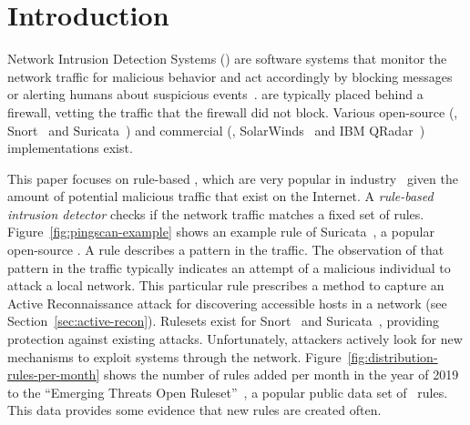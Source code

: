\documentclass[sigconf,review, anonymous]{acmart}
\begin{document}




\maketitle

\section{Introduction}
\label{sec:intro}

Network Intrusion Detection Systems (\nids{}) are software systems
that monitor the network traffic for malicious behavior and act
accordingly by blocking messages or alerting humans about suspicious
events~\cite{Mitchell:2014:SID:2597757.2542049}. \nids{} are typically
placed behind a firewall, vetting the traffic that the firewall did
not block. Various open-source (\eg{}, Snort~\cite{snort} and
Suricata~\cite{suricata}) and commercial (\eg{},
SolarWinds~\cite{solarwinds} and IBM QRadar~\cite{qradar})
implementations exist.

This paper focuses on rule-based \nids{}, which are very popular in
industry~\cite{proofpoint-etpro,snort-rule-subscriptions} given the
amount of potential malicious traffic that exist on the Internet. A
\emph{rule-based intrusion detector} checks if the network traffic matches a fixed
set of rules. Figure~\ref{fig:pingscan-example} shows an example rule
of Suricata~\cite{suricata}, a popular open-source \nids{}. A rule
describes a pattern in the traffic. The observation of that pattern in
the traffic typically indicates an attempt of a malicious individual
to attack a local network. This particular rule prescribes a method to
capture an Active Reconnaissance attack for discovering accessible
hosts in a network (see Section~\ref{sec:active-recon}). Rulesets
exist for Snort~\cite{snort} and Suricata~\cite{suricata}, providing
protection against existing attacks. Unfortunately, attackers actively
look for new mechanisms to exploit systems through the
network. Figure~\ref{fig:distribution-rules-per-month} shows the
number of rules added per month in the year of 2019 to the ``Emerging
Threats Open Ruleset''~\cite{emerging-threats-open}, a popular public
data set of \suri\ rules. This data provides some evidence that new
rules are created often.
\end{document}
